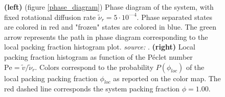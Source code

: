 \documentclass[class=report, float=false, crop=false]{standalone}
\begin{document}
\begin{figure}[h!]
\centering
{}
\caption{\textbf{(left)} (figure \ref{phase_diagram}) Phase diagram of the system, with fixed rotational diffusion rate $\tilde{\nu}_r = 5\cdot10^{—4}$. Phase separated states are colored in red and "frozen" states are colored in blue. The green arrow represents the path in phase diagram corresponding to the local packing fraction histogram plot. \textit{source:} \cite{fily2014freezing}. \textbf{(right)} Local packing fraction histogram as function of the P\'eclet number $\text{Pe} = \tilde{v}/\tilde{\nu}_r$. Colors correspond to the probability $P(\phi_{loc})$ of the local packing packing fraction $\phi_{loc}$ as reported on the color map. The red dashed line corresponds the system packing fraction $\phi = 1.00$.}
\label{philoc_v}
\end{figure}

\end{document}
